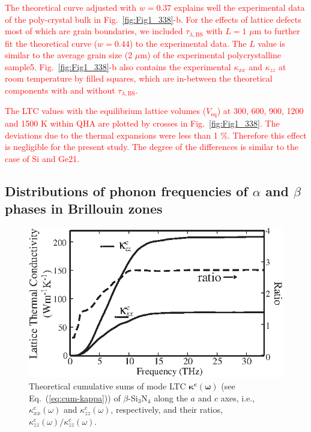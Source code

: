 \documentclass[twocolumn,amsmath,amssymb,a4paper,prb,superscriptaddress,floatfix]{revtex4-1}
\begin{document}
\textcolor{red}{The theoretical curve adjusted with $w=0.37$ explains
well the experimental data of the poly-crystal bulk in
Fig.~\ref{fig:Fig1_338}-b. For the effects of lattice defects most of
which are grain boundaries, we included $\tau_{\lambda,\text{BS}}$ with
$L = 1$ $\mu\text{m}$ to further fit the theoretical curve ($w=0.44$) to
the experimental data. The $L$ value is similar to the average grain
size (2 $\mu\text{m}$) of the experimental polycrystalline
sample5. Fig.~\ref{fig:Fig1_338}-b also contains the experimental
$\kappa$$_{xx}$ and $\kappa$$_{zz}$ at room temperature by filled
squares, which are in-between the theoretical components with and
without $\tau_{\lambda,\text{BS}}$.}

\textcolor{red}{The LTC values with the equilibrium lattice volumes
($V_\text{eq}$) at 300, 600, 900, 1200 and 1500 K within QHA are plotted
by crosses in Fig.~\ref{fig:Fig1_338}. The deviations due to the thermal
expansions were less than 1 \%. Therefore this effect is negligible for
the present study. The degree of the differences is similar to the case
of Si and Ge21.}

\subsection{Distributions of phonon frequencies of
  $\alpha$ and $\beta$ phases in Brillouin zones}

\begin{figure}[ht]
 \begin{center}
  \includegraphics[width=0.90\linewidth]{Fig2.eps}
  \caption{Theoretical cumulative sums of mode LTC
  $\boldsymbol{\kappa^\text{c}(\omega)}$ (see Eq.~(\ref{eq:cum-kappa})) of
  $\beta$-Si$_3$N$_4$ along the $a$ and $c$ axes, i.e.,
  $\kappa^\text{c}_{xx}(\omega)$ and $\kappa^\text{c}_{zz}(\omega)$,
  respectively, and their ratios,
  $\kappa^\text{c}_{zz}(\omega)/\kappa^\text{c}_{zz}(\omega)$.
  \label{fig:Fig2_ver2_338} }
 \end{center}
\end{figure}
\end{document}
